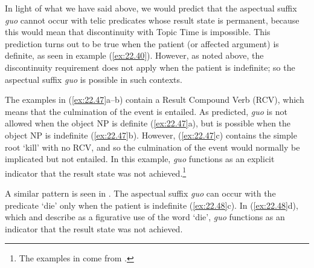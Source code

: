 In light of what we have said above, we would predict that the aspectual suffix \textit{guo} cannot occur with telic predicates whose result state is permanent, because this would mean that discontinuity with Topic Time is impossible. This prediction turns out to be true when the patient (or affected argument) is definite, as seen in example (\ref{ex:22.40}). However, as noted above, the discontinuity requirement does not apply when the patient is indefinite; so the aspectual suffix \textit{guo} is possible in such contexts.



The examples in (\ref{ex:22.47}a--b) contain a Result Compound Verb (RCV), which means that the culmination of the event is entailed. As predicted, \textit{guo} is not allowed when the object NP is definite (\ref{ex:22.47}a), but is possible when the object NP is indefinite (\ref{ex:22.47}b). However, (\ref{ex:22.47}c) contains the simple root ‘kill’ with no RCV, and so the culmination of the event would normally be implicated but not entailed. In this example, \textit{guo} functions as an explicit indicator that the result state was not achieved.\footnote{The examples in  come from \citet[23]{Ma1977}.}


\ea \label{ex:22.47}

\z \z


A similar pattern is seen in . The aspectual suffix \textit{guo} can occur with the predicate ‘die’ only when the patient is indefinite (\ref{ex:22.48}c). In (\ref{ex:22.48}d), which \citet{Chu1998} and \citet{XiaoMcEnery2004} describe as a figurative use of the word ‘die’, \textit{guo} functions as an indicator that the result state was not achieved.


